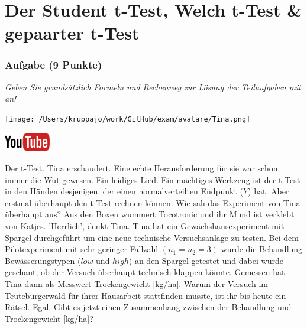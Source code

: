 \documentclass[a4paper, 9pt]{scrartcl}\usepackage[]{graphicx}\usepackage[]{xcolor}
\begin{document}
\clearpage
\part{Der Student t-Test, Welch t-Test \& gepaarter t-Test}

\section{Aufgabe \hfill (9 Punkte)}

\textit{Geben Sie grundsätzlich Formeln und Rechenweg zur Lösung der Teilaufgaben mit an!} \\[1Ex]
 

 
\begin{minipage}[t]{0.5\textwidth}
\texttt{[image: /Users/kruppajo/work/GitHub/exam/avatare/Tina.png]}
\end{minipage}
\begin{minipage}[t]{0.5\textwidth}
\hfill
\href{https://youtu.be/eejS2uG4o-M}{\includegraphics[width = 2cm]{img/youtube}}\\[1Ex]
\end{minipage}
\vspace{1ex}



Der t-Test. Tina erschaudert. Eine echte Herausforderung für sie war schon immer die Wut gewesen. Ein leidiges Lied. Ein mächtiges Werkzeug ist der t-Test in den Händen desjenigen, der einen normalverteilten Endpunkt ($Y$) hat. Aber erstmal überhaupt den t-Test rechnen können. Wie sah das Experiment von Tina überhaupt aus? Aus den Boxen wummert Tocotronic und ihr Mund ist verklebt von Katjes. 'Herrlich', denkt Tina. Tina hat ein Gewächshausexperiment mit Spargel durchgeführt um eine neue technische Versuchsanlage zu testen. Bei dem Pilotexperiment mit sehr geringer Fallzahl $(n_1 = n_2 = 3)$ wurde die Behandlung Bewässerungstypen ($low$ und $high$) an den Spargel getestet und dabei wurde geschaut, ob der Versuch überhaupt technisch klappen könnte. Gemessen hat Tina dann als Messwert Trockengewicht [kg/ha]. Warum der Versuch im Teuteburgerwald für ihrer Hausarbeit stattfinden musste, ist ihr bis heute ein Rätsel. Egal. Gibt es jetzt einen Zusammenhang zwischen der Behandlung und Trockengewicht [kg/ha]?
\end{document}
